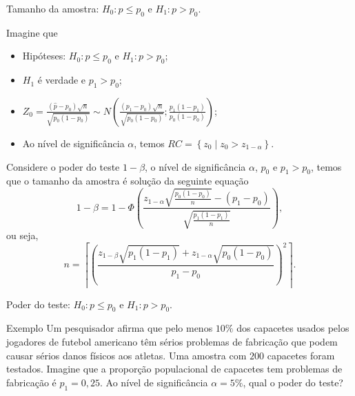 \documentclass[8pt]{beamer}
\begin{document}
\begin{frame}{Tamanho da amostra: $H_0: p \leq p_0$ e $H_1: p > p_0$.}

Imagine que 
\begin{itemize}
	\item Hipóteses: $H_0:p \leq p_0$ e $H_1: p > p_0$;
	\item $H_1$ é verdade e $p_1 > p_0$;
	\item $Z_0 = \frac{(\hat{p}-p_0)\sqrt{n}}{\sqrt{p_0 (1-p_0)}} \sim N \left( \frac{(p_1 - p_0)\sqrt{n}}{\sqrt{p_0(1-p_0)}}; \frac{p_1(1-p_1)}{p_0(1-p_0)} \right)$;
	\item Ao nível de significância $\alpha$, temos $RC = \left\{ z_0 \mid z_0 > z_{1-\alpha}  \right\}$.
\end{itemize}

Considere o poder do teste $1-\beta$, o nível de significância $\alpha$, $p_0$ e $p_1 > p_0$, temos que o tamanho da amostra é solução da seguinte equação
$$1-\beta =1-  \Phi\left( \frac{ z_{1-\alpha} \sqrt{ \frac{p_0(1-p_0)}{n}} - (p_1 - p_0)  }{ \sqrt{ \frac{ p_1(1-p_1) }{ n } } } \right), $$
ou seja, 
$$n = \left\lceil \left( \frac{ z_{1-\beta} \sqrt{p_1(1-p_1)} + z_{1-\alpha} \sqrt{p_0(1-p_0)} }{p_1 - p_0} \right)^2 \right\rceil.$$
\end{frame}

\begin{frame}{Poder do teste: $H_0: p \leq p_0$ e $H_1: p > p_0$.}

\large

\begin{block}{Exemplo}
	Um pesquisador afirma que pelo menos $10\%$ dos capacetes usados pelos jogadores de futebol americano têm sérios problemas de fabricação que podem causar sérios danos físicos aos atletas. Uma amostra com $200$ capacetes foram testados. Imagine que a proporção populacional de capacetes tem problemas de fabricação é $p_1=0,25$. Ao nível de significância $\alpha=5\%$, qual o poder do teste? 
\end{block}
\vfill
\normalsize
\end{frame}
\end{document}
